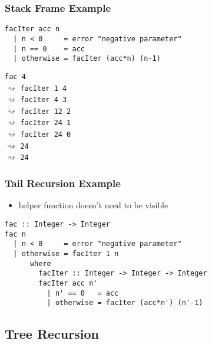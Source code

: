 \documentclass[dvipsnames]{beamer}
\theoremstyle{plain}
\begin{document}
\begin{frame}[fragile]
  \frametitle{Stack Frame Example}

  \begin{lstlisting}
facIter acc n
  | n < 0     = error "negative parameter"
  | n == 0    = acc
  | otherwise = facIter (acc*n) (n-1)
  \end{lstlisting}

  \lstinline{fac 4}\\
  $\rightsquigarrow$ \lstinline{facIter 1 4}\\
  \hspace{16pt}$\rightsquigarrow$ \lstinline{facIter 4 3}\\
  \hspace{16pt}$\rightsquigarrow$ \lstinline{facIter 12 2}\\
  \hspace{16pt}$\rightsquigarrow$ \lstinline{facIter 24 1}\\
  \hspace{16pt}$\rightsquigarrow$ \lstinline{facIter 24 0}\\
  \hspace{16pt}$\rightsquigarrow$ \lstinline{24}\\
  $\rightsquigarrow$ \lstinline{24}\\
\end{frame}

\begin{frame}[fragile]
  \frametitle{Tail Recursion Example}

  \begin{itemize}
    \item helper function doesn't need to be visible
  \end{itemize}

  \begin{lstlisting}
fac :: Integer -> Integer
fac n
  | n < 0     = error "negative parameter"
  | otherwise = facIter 1 n
      where
        facIter :: Integer -> Integer -> Integer
        facIter acc n'
          | n' == 0   = acc
          | otherwise = facIter (acc*n') (n'-1)
  \end{lstlisting}
\end{frame}

\subsection{Tree Recursion}
\end{document}
